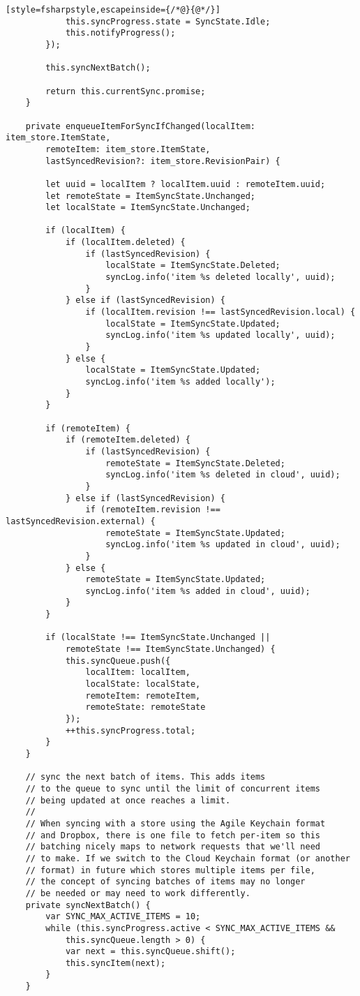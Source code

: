 \begin{lstlisting}[style=fsharpstyle,escapeinside={/*@}{@*/}]
			this.syncProgress.state = SyncState.Idle;
			this.notifyProgress();
		});

		this.syncNextBatch();

		return this.currentSync.promise;
	}

	private enqueueItemForSyncIfChanged(localItem: item_store.ItemState,
		remoteItem: item_store.ItemState,
		lastSyncedRevision?: item_store.RevisionPair) {

		let uuid = localItem ? localItem.uuid : remoteItem.uuid;
		let remoteState = ItemSyncState.Unchanged;
		let localState = ItemSyncState.Unchanged;

		if (localItem) {
			if (localItem.deleted) {
				if (lastSyncedRevision) {
					localState = ItemSyncState.Deleted;
					syncLog.info('item %s deleted locally', uuid);
				}
			} else if (lastSyncedRevision) {
				if (localItem.revision !== lastSyncedRevision.local) {
					localState = ItemSyncState.Updated;
					syncLog.info('item %s updated locally', uuid);
				}
			} else {
				localState = ItemSyncState.Updated;
				syncLog.info('item %s added locally');
			}
		}

		if (remoteItem) {
			if (remoteItem.deleted) {
				if (lastSyncedRevision) {
					remoteState = ItemSyncState.Deleted;
					syncLog.info('item %s deleted in cloud', uuid);
				}
			} else if (lastSyncedRevision) {
				if (remoteItem.revision !== lastSyncedRevision.external) {
					remoteState = ItemSyncState.Updated;
					syncLog.info('item %s updated in cloud', uuid);
				}
			} else {
				remoteState = ItemSyncState.Updated;
				syncLog.info('item %s added in cloud', uuid);
			}
		}

		if (localState !== ItemSyncState.Unchanged ||
			remoteState !== ItemSyncState.Unchanged) {
			this.syncQueue.push({
				localItem: localItem,
				localState: localState,
				remoteItem: remoteItem,
				remoteState: remoteState
			});
			++this.syncProgress.total;
		}
	}

	// sync the next batch of items. This adds items
	// to the queue to sync until the limit of concurrent items
	// being updated at once reaches a limit.
	//
	// When syncing with a store using the Agile Keychain format
	// and Dropbox, there is one file to fetch per-item so this
	// batching nicely maps to network requests that we'll need
	// to make. If we switch to the Cloud Keychain format (or another
	// format) in future which stores multiple items per file,
	// the concept of syncing batches of items may no longer
	// be needed or may need to work differently.
	private syncNextBatch() {
		var SYNC_MAX_ACTIVE_ITEMS = 10;
		while (this.syncProgress.active < SYNC_MAX_ACTIVE_ITEMS &&
			this.syncQueue.length > 0) {
			var next = this.syncQueue.shift();
			this.syncItem(next);
		}
	}


\end{lstlisting}
